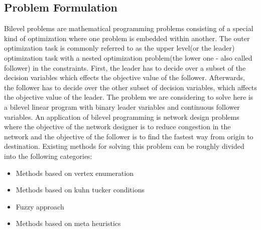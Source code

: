 \documentclass[a4paper, 12pt]{article}
\begin{document}
\subsection{Problem Formulation}
Bilevel problems are mathematical programming problems consisting of a special kind of optimization where one problem is embedded within another. The outer optimization task is commonly referred to as the upper level(or the leader) optimization task with a nested optimization problem(the lower one - also called follower) in the constraints. First, the leader has to decide over a subset of the decision variables which effects the objective value of the follower. Afterwards, the follower has to decide over the other subset of decision variables, which affects the objective value of the leader. The problem we are considering to solve here is a bilevel linear program with binary leader variables and continuous follower variables. An application of bilevel programming is network design problems where the objective of the network designer is to reduce congestion in the network and the objective of the follower is to find the fastest way from origin to destination. Existing methods for solving this problem can be roughly divided into the following categories:\par
\begin{itemize}
\item Methods based on vertex enumeration
\item Methods based on kuhn tucker conditions
\item Fuzzy approach
\item Methods based on meta heuristics
\end{itemize}
\end{document}
